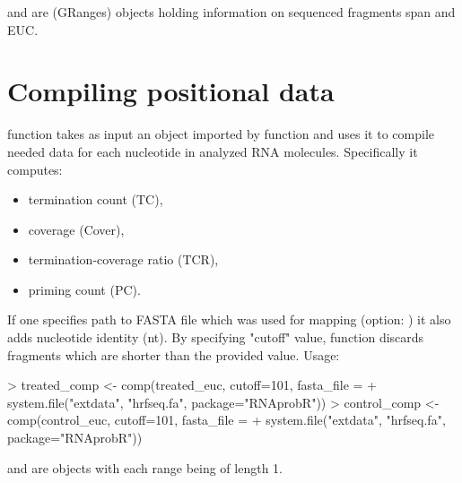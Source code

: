 \documentclass{article}
\begin{document}
 and  are  (GRanges) objects holding information on sequenced fragments span and EUC.

\section{Compiling positional data}

 function takes as input an object imported by  function and uses it to compile needed data for each nucleotide in analyzed RNA molecules. Specifically it computes:
\begin{itemize}
\item termination count (TC),
\item coverage (Cover),
\item termination-coverage ratio (TCR),
\item priming count (PC).
\end{itemize}

If one specifies path to FASTA file which was used for mapping (option: ) it also adds nucleotide identity (nt). By specifying "cutoff" value, function discards fragments which are shorter than the provided value.
Usage:

\begin{Schunk}
\begin{Sinput}
> treated_comp <- comp(treated_euc, cutoff=101, fasta_file =
+ system.file("extdata", "hrfseq.fa", package="RNAprobR"))
> control_comp <- comp(control_euc, cutoff=101, fasta_file =
+ system.file("extdata", "hrfseq.fa", package="RNAprobR"))
\end{Sinput}
\end{Schunk}
 and  are  objects with each range being of length 1.
\end{document}
